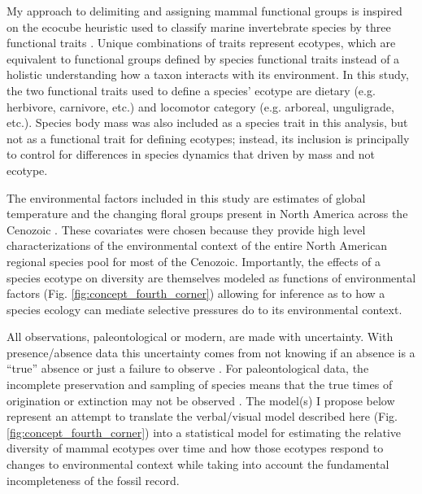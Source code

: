 My approach to delimiting and assigning mammal functional groups is inspired on the ecocube heuristic used to classify marine invertebrate species by three functional traits \citep{Bush2007,Bambach2007,Bush2011,Bush2012b,Novack-Gottshall2007,Villeger2011}. Unique combinations of traits represent ecotypes, which are equivalent to functional groups defined by species functional traits instead of a holistic understanding how a taxon interacts with its environment. In this study, the two functional traits used to define a species' ecotype are dietary (e.g. herbivore, carnivore, etc.) and locomotor category (e.g. arboreal, unguligrade, etc.). Species body mass was also included as a species trait in this analysis, but not as a functional trait for defining ecotypes; instead, its inclusion is principally to control for differences in species dynamics that driven by mass and not ecotype.

The environmental factors included in this study are estimates of global temperature and the changing floral groups present in North America across the Cenozoic \citep{Cramer2011,Graham2011a}. These covariates were chosen because they provide high level characterizations of the environmental context of the entire North American regional species pool for most of the Cenozoic. Importantly, the effects of a species ecotype on diversity are themselves modeled as functions of environmental factors (Fig. \ref{fig:concept_fourth_corner}) allowing for inference as to how a species ecology can mediate selective pressures do to its environmental context. 

All observations, paleontological or modern, are made with uncertainty. With presence/absence data this uncertainty comes from not knowing if an absence is a ``true'' absence or just a failure to observe \citep{Royle2008,Royle2005,Foote1999a,Foote2001,Lloyd2011,Wang2016b}. For paleontological data, the incomplete preservation and sampling of species means that the true times of origination or extinction may not be observed \citep{Foote1999a,Foote2001,Wang2015,Wang2016b}. The model(s) I propose below represent an attempt to translate the verbal/visual model described here (Fig. \ref{fig:concept_fourth_corner}) into a statistical model for estimating the relative diversity of mammal ecotypes over time and how those ecotypes respond to changes to environmental context while taking into account the fundamental incompleteness of the fossil record.

